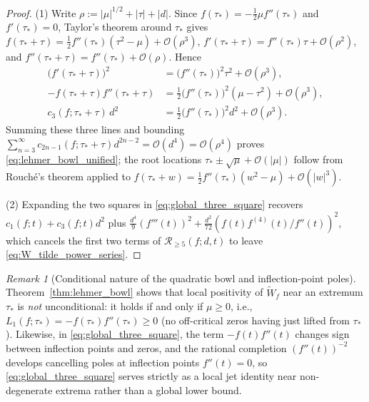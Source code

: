 \documentclass[11pt,reqno]{amsart}
\theoremstyle{definition}
\theoremstyle{remark}
\newtheorem{remark}[theorem]{Remark}
\numberwithin{equation}{section}
\begin{document}
\begin{proof}
(1) Write $\rho := \lvert\mu\rvert^{1/2} + \lvert\tau\rvert + \lvert d\rvert$. Since $f(\tau_*) = -\frac{1}{2}\mu f''(\tau_*)$ and $f'(\tau_*) = 0$, Taylor's theorem around $\tau_*$ gives $f(\tau_* + \tau) = \frac{1}{2}f''(\tau_*)(\tau^2 - \mu) + \mathcal{O}(\rho^3)$, $f'(\tau_*+\tau) = f''(\tau_*)\tau + \mathcal{O}(\rho^2)$, and $f''(\tau_*+\tau) = f''(\tau_*) + \mathcal{O}(\rho)$. Hence
\begin{align*}
  \bigl(f'(\tau_*+\tau)\bigr)^2 &= \bigl(f''(\tau_*)\bigr)^2\tau^2 + \mathcal{O}(\rho^3), \\
  -f(\tau_*+\tau)f''(\tau_*+\tau) &= \frac{1}{2}\bigl(f''(\tau_*)\bigr)^2(\mu - \tau^2) + \mathcal{O}(\rho^3), \\
  c_3(f; \tau_*+\tau)\,d^2 &= \frac{1}{2}\bigl(f''(\tau_*)\bigr)^2 d^2 + \mathcal{O}(\rho^3).
\end{align*}
Summing these three lines and bounding $\sum_{n=3}^\infty c_{2n-1}(f; \tau_*+\tau)d^{2n-2} = \mathcal{O}(d^4) = \mathcal{O}(\rho^4)$ proves \eqref{eq:lehmer_bowl_unified}; the root locations $\tau_* \pm \sqrt{\mu} + \mathcal{O}(\lvert\mu\rvert)$ follow from Rouch\'e's theorem applied to $f(\tau_*+w) = \frac{1}{2}f''(\tau_*)(w^2 - \mu) + \mathcal{O}(\lvert w\rvert^3)$.

(2) Expanding the two squares in \eqref{eq:global_three_square} recovers $c_1(f;t) + c_3(f;t)d^2$ plus $\frac{d^4}{9}(f'''(t))^2 + \frac{d^2}{72}(f(t)f^{(4)}(t)/f''(t))^2$, which cancels the first two terms of $\mathcal{R}_{\ge 5}(f;d,t)$ to leave \eqref{eq:W_tilde_power_series}.
\end{proof}

\begin{remark}[Conditional nature of the quadratic bowl and inflection-point poles]\label{rem:bowl_conditional}
Theorem~\ref{thm:lehmer_bowl} shows that local positivity of $\widetilde{W}_f$ near an extremum $\tau_*$ is \emph{not} unconditional: it holds if and only if $\mu \ge 0$, i.e., $L_1(f; \tau_*) = -f(\tau_*)f''(\tau_*) \ge 0$ (no off-critical zeros having just lifted from $\tau_*$). Likewise, in \eqref{eq:global_three_square}, the term $-f(t)f''(t)$ changes sign between inflection points and zeros, and the rational completion $(f''(t))^{-2}$ develops cancelling poles at inflection points $f''(t) = 0$, so \eqref{eq:global_three_square} serves strictly as a local jet identity near non-degenerate extrema rather than a global lower bound.
\end{remark}
\end{document}

